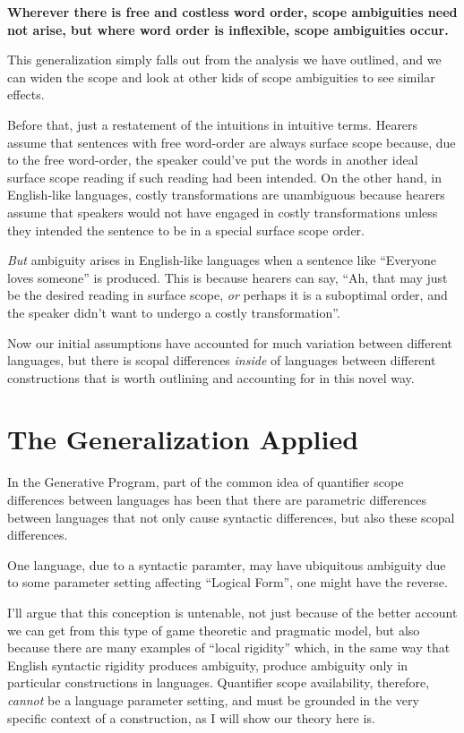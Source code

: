 \documentclass{article}
\begin{document}
\begin{exe}
\ex \textbf{Wherever there is free and costless word order, scope ambiguities need not arise, but where word order is inflexible, scope ambiguities occur.
\label{gen}}
\end{exe}

This generalization simply falls out from the analysis we have outlined, and we can widen the scope and look at other kids of scope ambiguities to see similar effects.

Before that, just a restatement of the intuitions in intuitive terms.
Hearers assume that sentences with free word-order are always surface scope because, due to the free word-order, the speaker could've put the words in another ideal surface scope reading if such reading had been intended.
On the other hand, in English-like languages, costly transformations are unambiguous because hearers assume that speakers would not have engaged in costly transformations unless they intended the sentence to be in a special surface scope order.

\emph{But} ambiguity arises in English-like languages when a sentence like ``Everyone loves someone'' is produced.
This is because hearers can say, ``Ah, that may just be the desired reading in surface scope, \emph{or} perhaps it is a suboptimal order, and the speaker didn't want to undergo a costly transformation''.

Now our initial assumptions have accounted for much variation between different languages, but there is scopal differences \emph{inside} of languages between different constructions that is worth outlining and accounting for in this novel way.

\section{The Generalization Applied}

In the Generative Program, part of the common idea of quantifier scope differences between languages has been that there are parametric differences between languages that not only cause syntactic differences, but also these scopal differences.

One language, due to a syntactic paramter, may have ubiquitous ambiguity due to some parameter setting affecting ``Logical Form'', one might have the reverse.

I'll argue that this conception is untenable, not just because of the better account we can get from this type of game theoretic and pragmatic model, but also because there are many examples of ``local rigidity'' which, in the same way that English syntactic rigidity produces ambiguity, produce ambiguity only in particular constructions in languages.
Quantifier scope availability, therefore, \emph{cannot} be a language parameter setting, and must be grounded in the very specific context of a construction, as I will show our theory here is.
\end{document}
